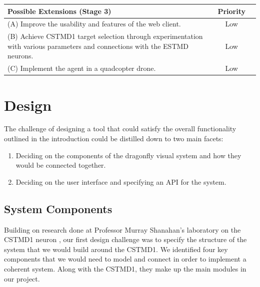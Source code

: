\documentclass[a4paper,11pt]{article}
\begin{document}
\begin{center}
    \begin{tabular}{p{12cm} c c}
    \textbf{Possible Extensions (Stage 3)} & \textbf{Priority} \\ \hline
	(A) Improve the usability and features of the web client. & Low\\
	(B) Achieve CSTMD1 target selection through experimentation with various parameters and connections with the ESTMD neurons. & Low\\
	(C) Implement the agent in a quadcopter drone. & Low\\
    \end{tabular}
\end{center}






\clearpage
\section{Design}

The challenge of designing a tool that could satisfy the overall functionality outlined in the introduction could be distilled down to two main facets:
\begin{enumerate}
\item Deciding on the components of the dragonfly visual system and how they would be connected together.
\item Deciding on the user interface and specifying an API for the system.
\end{enumerate}

\subsection{System Components}

Building on research done at Professor Murray Shanahan's laboratory on the CSTMD1 neuron \cite{ne13}, our first design challenge was to specify the structure of the system that we would build around the CSTMD1. We identified four key components that we would need to model and connect in order to implement a coherent system. Along with the CSTMD1, they make up the main modules in our project.
\end{document}
